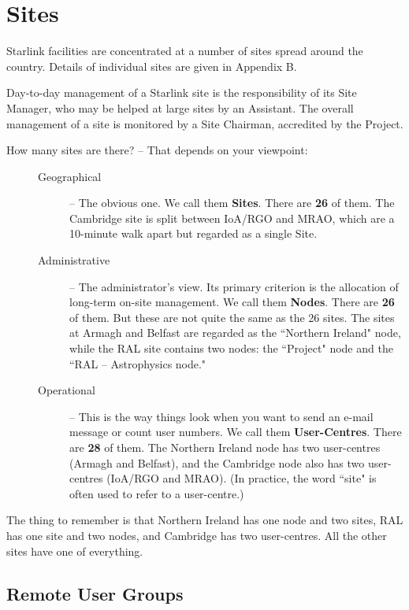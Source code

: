 \documentclass[twoside,11pt]{article}
\newcommand{\htmladdnormallink}[2]{#1}
\newenvironment{latexonly}{}{}
\begin{document}
\section*{Sites}

Starlink facilities are concentrated at a number of
\htmladdnormallink{sites}{http://www.starlink.ac.uk/sites.html}
spread around the country.
\begin{latexonly}
Details of individual sites are given in Appendix B.
\end{latexonly}

Day-to-day management of a Starlink site is the responsibility of its
Site Manager, who may be helped at large sites by an Assistant.
The overall management of a site is monitored by a Site Chairman, accredited by
the Project.

How many sites are there? -- That depends on your viewpoint:
\begin{description}
\item[\mbox{}]\mbox{}
\begin{description}
\item [Geographical] --
 The obvious one.
 We call them {\bf Sites}.
 There are {\bf 26} of them.
 The Cambridge site is split between IoA/RGO and MRAO, which are a 10-minute
 walk apart but regarded as a single Site.
\item [Administrative] --
 The administrator's view.
 Its primary criterion is the allocation of long-term  on-site management.
 We call them {\bf Nodes}.
 There are {\bf 26} of them.
 But these are not quite the same as the 26 sites.
 The sites at Armagh and Belfast are regarded as the ``Northern Ireland" node,
 while the RAL site contains two nodes: the ``Project" node and the
 ``RAL -- Astrophysics node."
\item [Operational] --
 This is the way things look when you want to send an e-mail message or
 count user numbers.
 We call them {\bf User-Centres}.
 There are {\bf 28} of them.
 The Northern Ireland node has two user-centres (Armagh and Belfast), and
 the Cambridge node also has two user-centres (IoA/RGO and MRAO).
 (In practice, the word ``site" is often used to refer to a user-centre.)
\end{description}
\end{description}
The thing to remember is that Northern Ireland has one node and two sites,
RAL has one site and two nodes, and Cambridge has two user-centres.
All the other sites have one of everything.

\subsection*{Remote User Groups}
\end{document}

